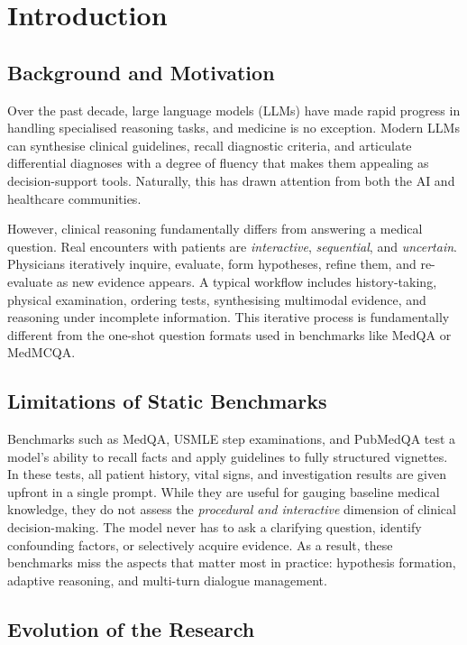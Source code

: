 \chapter{Introduction}
\label{Chapter1}


\section{Background and Motivation}

Over the past decade, large language models (LLMs) have made rapid progress in handling specialised reasoning tasks, and medicine is no exception. Modern LLMs can synthesise clinical guidelines, recall diagnostic criteria, and articulate differential diagnoses with a degree of fluency that makes them appealing as decision-support tools. Naturally, this has drawn attention from both the AI and healthcare communities.

However, clinical reasoning fundamentally differs from answering a medical question. Real encounters with patients are \textit{interactive}, \textit{sequential}, and \textit{uncertain}. Physicians iteratively inquire, evaluate, form hypotheses, refine them, and re-evaluate as new evidence appears. A typical workflow includes history-taking, physical examination, ordering tests, synthesising multimodal evidence, and reasoning under incomplete information. This iterative process is fundamentally different from the one-shot question formats used in benchmarks like MedQA or MedMCQA.

\section{Limitations of Static Benchmarks}

Benchmarks such as MedQA, USMLE step examinations, and PubMedQA test a model's ability to recall facts and apply guidelines to fully structured vignettes. In these tests, all patient history, vital signs, and investigation results are given upfront in a single prompt. While they are useful for gauging baseline medical knowledge, they do not assess the \textit{procedural and interactive} dimension of clinical decision-making. The model never has to ask a clarifying question, identify confounding factors, or selectively acquire evidence. As a result, these benchmarks miss the aspects that matter most in practice: hypothesis formation, adaptive reasoning, and multi-turn dialogue management.

\section{Evolution of the Research}

